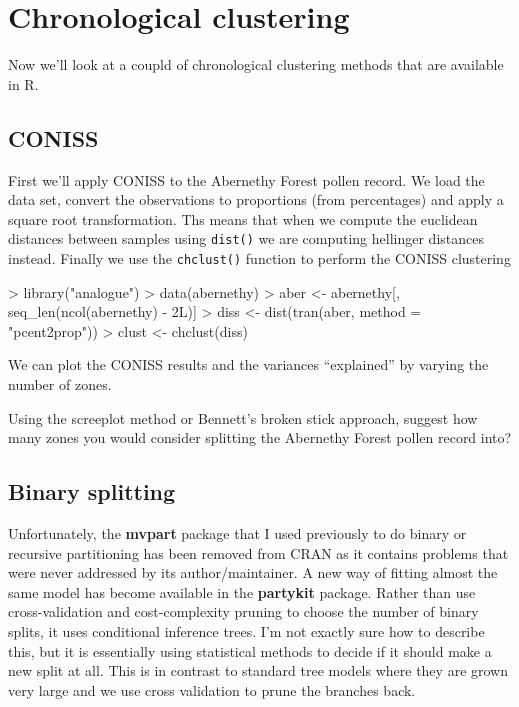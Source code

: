 \documentclass[a4paper,10pt]{article}
\newcommand{\R}{\textsf{R}\xspace}
\begin{document}
\section{Chronological clustering}

Now we'll look at a coupld of chronological clustering methods that are available in \R.

\subsection{CONISS}

First we'll apply CONISS to the Abernethy Forest pollen record. We load the data set, convert the observations to proportions (from percentages) and apply a square root transformation. Ths means that when we compute the euclidean distances between samples using \texttt{dist()} we are computing hellinger distances instead. Finally we use the \texttt{chclust()} function to perform the CONISS clustering

\begin{Schunk}
\begin{Sinput}
> library("analogue")
> data(abernethy)
> aber <- abernethy[, seq_len(ncol(abernethy) - 2L)]
> diss <- dist(tran(aber, method = "pcent2prop"))
> clust <- chclust(diss)
\end{Sinput}
\end{Schunk}

We can plot the CONISS results and the variances ``explained'' by varying the number of zones.

\begin{Schunk}
\end{Schunk}

Using the screeplot method or Bennett's broken stick approach, suggest how many zones you would consider splitting the Abernethy Forest pollen record into?

\subsection{Binary splitting}

Unfortunately, the \textbf{mvpart} package that I used previously to do binary or recursive partitioning has been removed from CRAN as it contains problems that were never addressed by its author/maintainer. A new way of fitting almost the same model has become available in the \textbf{partykit} package. Rather than use cross-validation and cost-complexity pruning to choose the number of binary splits, it uses conditional inference trees. I'm not exactly sure how to describe this, but it is essentially using statistical methods to decide if it should make a new split at all. This is in contrast to standard tree models where they are grown very large and we use cross validation to prune the branches back.
\end{document}
